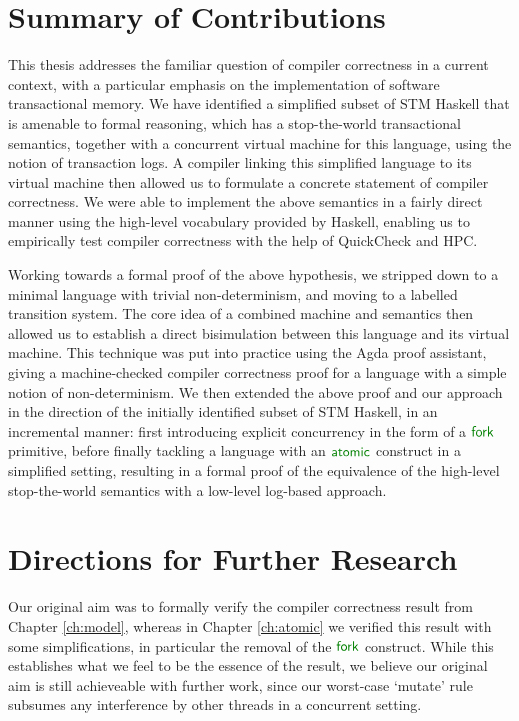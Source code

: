 
\section{Summary of Contributions}%

This thesis addresses the familiar question of compiler correctness in
a current context, with a particular emphasis on the implementation of
software transactional memory. We have identified a simplified subset of STM
Haskell that is amenable to formal reasoning, which has a stop-the-world
transactional semantics, together with a concurrent virtual machine for this
language, using the notion of transaction logs. A compiler linking this
simplified language to its virtual machine then allowed us to formulate
a concrete statement of compiler correctness. We were able to implement the
above semantics in a fairly direct manner using the high-level vocabulary
provided by Haskell, enabling us to empirically test compiler correctness
with the help of QuickCheck and HPC.

Working towards a formal proof of the above hypothesis, we stripped down to
a minimal language with trivial non-determinism, and moving to a labelled
transition system. The core idea of a combined machine and semantics then
allowed us to establish a direct bisimulation between this language and its
virtual machine. This technique was put into practice using the Agda proof
assistant, giving a machine-checked compiler correctness proof for
a language with a simple notion of non-determinism. We then extended the
above proof and our approach in the direction of the initially identified
subset of STM Haskell, in an incremental manner: first introducing explicit
concurrency in the form of a $\cons{fork}$ primitive, before finally
tackling a language with an $\cons{atomic}$ construct in a simplified
setting, resulting in a formal proof of the equivalence of the high-level
stop-the-world semantics with a low-level log-based approach.


\section{Directions for Further Research}%

Our original aim was to formally verify the compiler correctness result from
Chapter \ref{ch:model}, whereas in Chapter \ref{ch:atomic} we verified this
result with some simplifications, in particular the removal of the
$\cons{fork}$ construct. While this establishes what we feel to be the
essence of the result, we believe our original aim is still achieveable with
further work, since our worst-case `mutate' rule subsumes any interference
by other threads in a concurrent setting.

